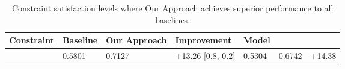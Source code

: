 \begin{table}[htbp]
\caption{Constraint satisfaction levels where Our Approach achieves superior performance to all baselines.}
\label{tab:wins_only}
\begin{tabular}{lllll}
\toprule
Constraint & Baseline & Our Approach & Improvement & Model \\
\midrule
[0.5, 0.3] & 0.5801 & 0.7127 & +13.26%
[0.8, 0.2] & 0.5304 & 0.6742 & +14.38%
\bottomrule
\end{tabular}
\end{table}
